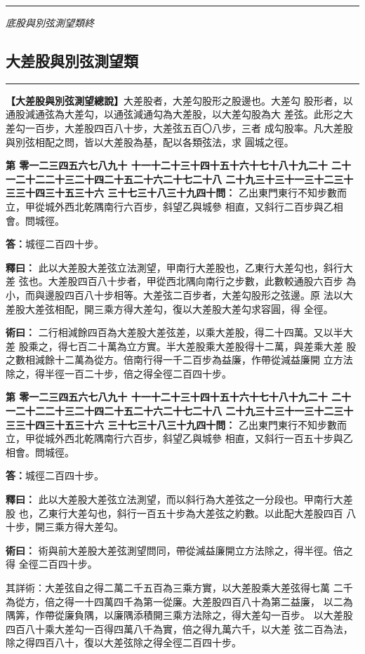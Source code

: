 \documentclass[11pt,a4paper]{article}
\newcommand{\longline}{\noindent\rule{\textwidth}{0.4pt}}
\newcounter{probnum}
\newcommand{\chnum}[1]{%
  \ifcase#1 零\or 一\or 二\or 三\or 四\or 五\or 六\or 七\or 八\or 九\or 十\or
    十一\or 十二\or 十三\or 十四\or 十五\or 十六\or 十七\or 十八\or 十九\or 二十\or
    二十一\or 二十二\or 二十三\or 二十四\or 二十五\or 二十六\or 二十七\or 二十八\or
    二十九\or 三十\or 三十一\or 三十二\or 三十三\or 三十四\or 三十五\or 三十六\or
    三十七\or 三十八\or 三十九\or 四十\fi}
\newcommand{\problem}[1]{\stepcounter{probnum}\par\noindent\textbf{第\chnum{\value{probnum}}問：}#1\par}
\newcommand{\answer}[1]{\par\noindent\textbf{答：}#1\par}
\newcommand{\shiyi}[1]{\par\noindent\textbf{釋曰：}#1\par}
\newcommand{\shuyue}[1]{\par\noindent\textbf{術曰：}#1\par}
\begin{document}
\vspace{0.5cm}
\longline
\begin{center}
\textit{底股與別弦測望類終}
\end{center}

\newpage
\setcounter{probnum}{0}

\subsection*{大差股與別弦測望類}
\vspace{0.3cm}
\longline
\vspace{0.3cm}

\noindent
\textbf{【大差股與別弦測望總說】}大差股者，大差勾股形之股邊也。大差勾
股形者，以通股減通弦為大差勾，以通弦減通勾為大差股，以大差勾股為大
差弦。此形之大差勾一百步，大差股四百八十步，大差弦五百〇八步，三者
成勾股率。凡大差股與別弦相配之問，皆以大差股為基，配以各類弦法，求
圓城之徑。

\problem{
乙出東門東行不知步數而立，甲從城外西北乾隅南行六百步，斜望乙與城參
相直，又斜行二百步與乙相會。問城徑。
}

\answer{城徑二百四十步。}

\shiyi{
此以大差股大差弦立法測望，甲南行大差股也，乙東行大差勾也，斜行大差
弦也。大差股四百八十步者，甲從西北隅向南行之步數，此數較通股六百步
為小，而與邊股四百八十步相等。大差弦二百步者，大差勾股形之弦邊。原
法以大差股大差弦相配，開三乘方得大差勾，復以大差股大差勾求容圓，得
全徑。
}

\shuyue{
二行相減餘四百為大差股大差弦差，以乘大差股，得二十四萬。又以半大差
股乘之，得七百二十萬為立方實。半大差股乘大差股得十二萬，與差乘大差
股之數相減餘十二萬為從方。倍南行得一千二百步為益廉，作帶從減益廉開
立方法除之，得半徑一百二十步，倍之得全徑二百四十步。
}

\vspace{0.3cm}
\problem{
乙出東門東行不知步數而立，甲從城外西北乾隅南行六百步，斜望乙與城參
相直，又斜行一百五十步與乙相會。問城徑。
}

\answer{城徑二百四十步。}

\shiyi{
此以大差股大差弦立法測望，而以斜行為大差弦之一分段也。甲南行大差股
也，乙東行大差勾也，斜行一百五十步為大差弦之約數。以此配大差股四百
八十步，開三乘方得大差勾。
}

\shuyue{
術與前大差股大差弦測望問同，帶從減益廉開立方法除之，得半徑。倍之得
全徑二百四十步。

其詳術：大差弦自之得二萬二千五百為三乘方實，以大差股乘大差弦得七萬
二千為從方，倍之得一十四萬四千為第一從廉。大差股四百八十為第二益廉，
以二為隅筭，作帶從廉負隅，以廉隅添積開三乘方法除之，得大差勾一百步。
以大差股四百八十乘大差勾一百得四萬八千為實，倍之得九萬六千，以大差
弦二百為法，除之得四百八十，復以大差弦除之得全徑二百四十步。
}
\end{document}
